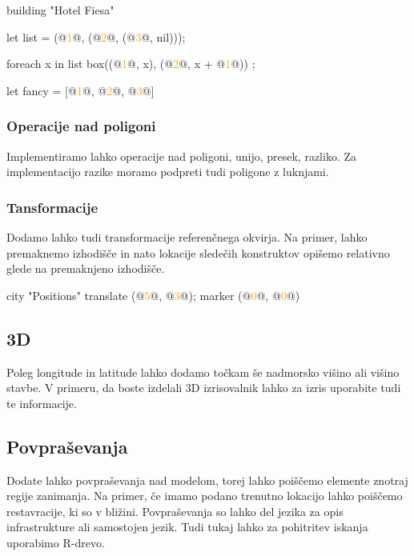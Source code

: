 \documentclass{article}
\newcommand\Num[1]{\textcolor{orange}{#1}}
\begin{document}
\begin{CITY}
  building "Hotel Fiesa" {
    let list = (@\Num{1}@, (@\Num{2}@, (@\Num{3}@, nil)));

    foreach x in list {
      box((@\Num{1}@, x), (@\Num{2}@, x + @\Num{1}@))
    };

    let fancy = [@\Num{1}@, @\Num{2}@, @\Num{3}@]
  }
\end{CITY}

\subsubsection{Operacije nad poligoni}
Implementiramo lahko operacije nad poligoni, unijo, presek, razliko.
Za implementacijo razike moramo podpreti tudi poligone z luknjami.

\subsubsection{Tansformacije}
Dodamo lahko tudi transformacije referenčnega okvirja.
Na primer, lahko premaknemo izhodišče in nato lokacije sledečih konstruktov opišemo relativno glede na premaknjeno izhodišče.

\begin{CITY}
  city "Positions" {
    translate (@\Num{5}@, @\Num{3}@);
    marker (@\Num{0}@, @\Num{0}@)
  }
\end{CITY}

\subsection{3D}
Poleg longitude in latitude lahko dodamo točkam še nadmorsko višino ali višino stavbe.
V primeru, da boste izdelali 3D izrisovalnik lahko za izris uporabite tudi te informacije.

\subsection{Povpraševanja}
Dodate lahko povpraševanja nad modelom, torej lahko poiščemo elemente znotraj regije zanimanja.
Na primer, če imamo podano trenutno lokacijo lahko poiščemo restavracije, ki so v bližini.
Povpraševanja so lahko del jezika za opis infrastrukture ali samostojen jezik.
Tudi tukaj lahko za pohitritev iskanja uporabimo R-drevo.
\end{document}
